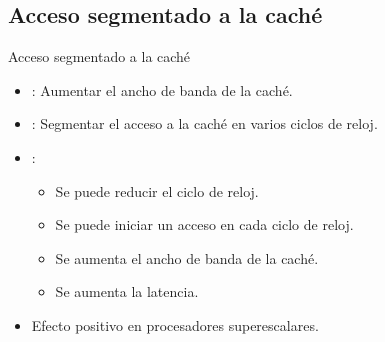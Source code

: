 \subsection{Acceso segmentado a la caché}

\begin{frame}[t]{Acceso segmentado a la caché}
\begin{itemize}
  \item {}: Aumentar el ancho de banda de la caché.

  \item {}: Segmentar el acceso a la caché en varios ciclos de reloj.

  \item {}:
    \begin{itemize}
      \item Se puede reducir el ciclo de reloj.
      \item Se puede iniciar un acceso en cada ciclo de reloj.
      \item Se aumenta el ancho de banda de la caché.
      \item Se aumenta la latencia.
    \end{itemize}

  \item Efecto positivo en procesadores superescalares.
\end{itemize}
\end{frame}
